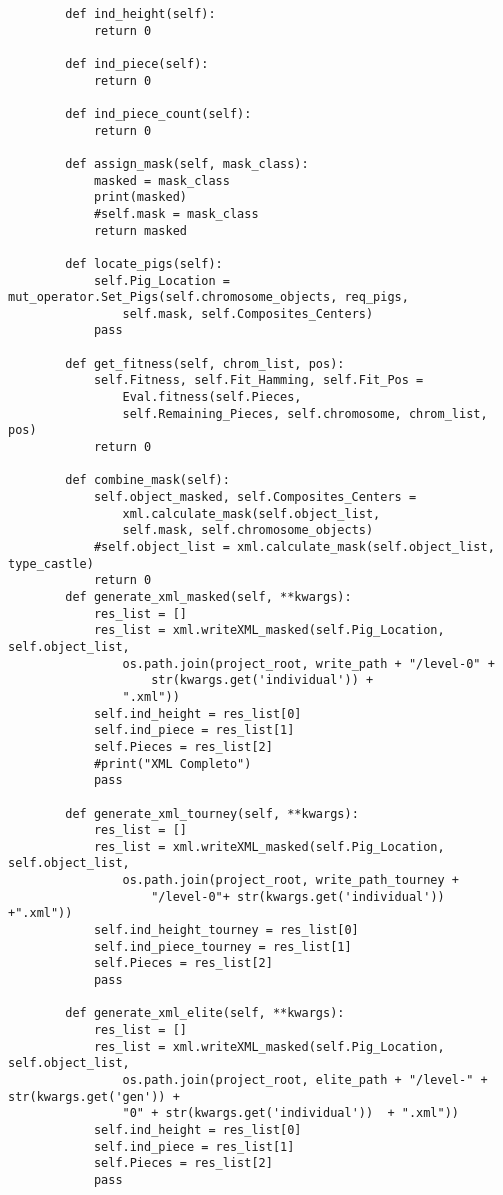 \begin{verbatim}
        def ind_height(self):
            return 0
        
        def ind_piece(self):
            return 0
        
        def ind_piece_count(self):
            return 0

        def assign_mask(self, mask_class):
            masked = mask_class
            print(masked)
            #self.mask = mask_class 
            return masked

        def locate_pigs(self):
            self.Pig_Location = mut_operator.Set_Pigs(self.chromosome_objects, req_pigs, 
                self.mask, self.Composites_Centers)
            pass
        
        def get_fitness(self, chrom_list, pos):
            self.Fitness, self.Fit_Hamming, self.Fit_Pos = 
                Eval.fitness(self.Pieces, 
                self.Remaining_Pieces, self.chromosome, chrom_list, pos)
            return 0
        
        def combine_mask(self):
            self.object_masked, self.Composites_Centers = 
                xml.calculate_mask(self.object_list, 
                self.mask, self.chromosome_objects)
            #self.object_list = xml.calculate_mask(self.object_list, type_castle)
            return 0
        def generate_xml_masked(self, **kwargs):
            res_list = []
            res_list = xml.writeXML_masked(self.Pig_Location, self.object_list, 
                os.path.join(project_root, write_path + "/level-0" + 
                    str(kwargs.get('individual')) + 
                ".xml"))
            self.ind_height = res_list[0]
            self.ind_piece = res_list[1]
            self.Pieces = res_list[2]
            #print("XML Completo")
            pass
        
        def generate_xml_tourney(self, **kwargs):
            res_list = []
            res_list = xml.writeXML_masked(self.Pig_Location, self.object_list, 
                os.path.join(project_root, write_path_tourney + 
                    "/level-0"+ str(kwargs.get('individual')) +".xml"))
            self.ind_height_tourney = res_list[0]
            self.ind_piece_tourney = res_list[1]
            self.Pieces = res_list[2]
            pass

        def generate_xml_elite(self, **kwargs):
            res_list = []
            res_list = xml.writeXML_masked(self.Pig_Location, self.object_list, 
                os.path.join(project_root, elite_path + "/level-" + str(kwargs.get('gen')) + 
                "0" + str(kwargs.get('individual'))  + ".xml"))
            self.ind_height = res_list[0]
            self.ind_piece = res_list[1]
            self.Pieces = res_list[2]
            pass
        


\end{verbatim}
